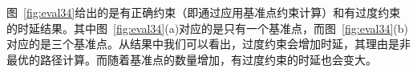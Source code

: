 图~\ref{fig:eval34}给出的是有正确约束（即通过应用基准点约束计算）和有过度约束的时延结果。其中图~\ref{fig:eval34}(a)对应的是只有一个基准点，而图~\ref{fig:eval34}(b)对应的是三个基准点。从结果中我们可以看出，过度约束会增加时延，其理由是非最优的路径计算。而随着基准点的数量增加，有过度约束的时延也会变大。




